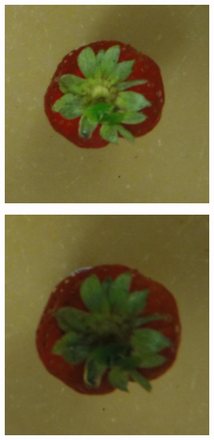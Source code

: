 \documentclass {udthesis}
\begin{document}
\begin{figure}
\begin{subfigure}[]{0.12\textwidth}
      \caption{}
  \end{subfigure}
  \begin{subfigure}[]{0.12\textwidth}
      \includegraphics[width=\textwidth]{strawberry4_obj_01/strawberry4_001_12}
      \caption{}
  \end{subfigure}
  \begin{subfigure}[]{0.12\textwidth}
      \includegraphics[width=\textwidth]{strawberry4_obj_01/strawberry4_001_10}

\end{subfigure}
\end{figure}
\end{document}

